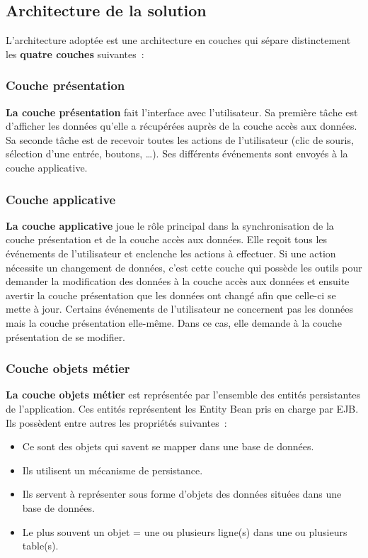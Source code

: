 \documentclass[a4paper, titlepage]{report}
\let\oldparagraph\subsubsection
\renewcommand{\subsubsection}[1]{\oldparagraph{#1}\mbox{}}
\begin{document}
\subsection{Architecture de la solution}

L'architecture adoptée est une architecture en couches qui sépare
distinctement les \textbf{quatre couches} suivantes~:

\subsubsection{Couche présentation}

\textbf{La couche présentation} fait l'interface avec l'utilisateur. Sa première
tâche est d'afficher les données qu'elle a récupérées auprès de la
couche accès aux données. Sa seconde tâche est de recevoir toutes les
actions de l'utilisateur (clic de souris, sélection d'une entrée,
boutons, \ldots{}). Ses différents événements sont envoyés à la couche
applicative.

\subsubsection{Couche applicative}

\textbf{La couche applicative} joue le rôle principal dans la synchronisation de
la couche présentation et de la couche accès aux données. Elle reçoit tous
les événements de l'utilisateur et enclenche les actions à effectuer. Si
une action nécessite un changement de données, c'est cette couche qui
possède les outils pour demander la modification des données à la couche
accès aux données et ensuite avertir la couche présentation que les
données ont changé afin que celle-ci se mette à jour. Certains
événements de l'utilisateur ne concernent pas les données mais la couche
présentation elle-même. Dans ce cas, elle demande à la couche
présentation de se modifier.

\subsubsection{Couche objets métier}

\textbf{La couche objets métier} est représentée par l'ensemble des entités
persistantes de l'application. Ces entités représentent les Entity Bean
pris en charge par EJB. Ils possèdent entre autres les propriétés
suivantes~:
\begin{itemize}
\item Ce sont des objets qui savent se mapper dans une base de
données.
\item Ils utilisent un mécanisme de persistance.
\item Ils servent à
représenter sous forme d'objets des données situées dans une base de
données.
\item Le plus souvent un objet = une ou plusieurs ligne(s) dans une
ou plusieurs table(s).
\end{itemize}
\end{document}

